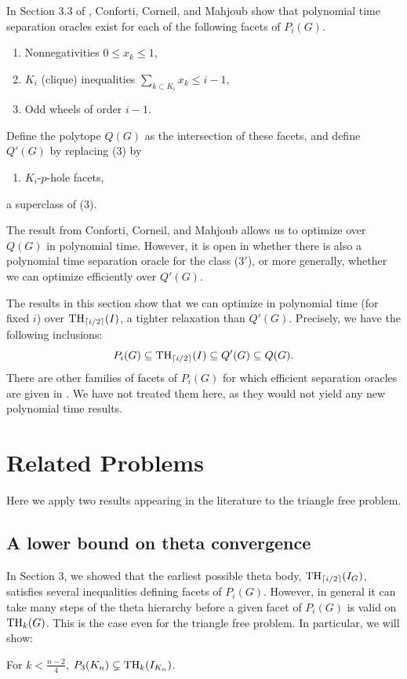 In Section 3.3 of \cite{conforti}, Conforti, Corneil, and Mahjoub show that polynomial time separation oracles exist for each of the following facets of $P_i(G)$.
\begin{enumerate}
\item Nonnegativities $0 \le x_k \le 1$,
\item $K_i$ (clique) inequalities $\sum_{k \subset K_i}x_k \le i-1$,
\item Odd wheels of order $i-1$.
\end{enumerate}
Define the polytope $Q(G)$ as the intersection of these facets, and define $Q'(G)$ by replacing (3) by 
\begin{enumerate}[label=(\arabic*$'$),ref=(\arabic*$'$),start=3]
\item $K_i$-$p$-hole facets,
\end{enumerate}
a superclass of (3).

The result from Conforti, Corneil, and Mahjoub \cite{conforti} allows us to optimize over $Q(G)$ in polynomial time. However, it is open in \cite{conforti} whether there is also a polynomial time separation oracle for the class ($3'$), or more generally, whether we can optimize efficiently over $Q'(G)$. 

The results in this section show that we can optimize in polynomial time (for
fixed $i$) over $\textup{TH}_{\lceil i/2 \rceil}(I)$, a tighter relaxation than $Q'(G)$. Precisely, we have the following inclusions:
$$P_{i}(G) \subseteq  \textup{TH}_{\lceil i/2 \rceil}(I) \subseteq Q'(G) \subseteq Q(G).$$
There are other families of facets of $P_i(G)$ for which efficient separation oracles are given in \cite{conforti}. We have not treated them here, as they would not yield any new polynomial time results.

\section{Related Problems}
Here we apply two results appearing in the literature to the triangle free problem.

\subsection{A lower bound on theta convergence}
In Section 3, we showed that the earliest possible theta body, $\textup{TH}_{\lceil i/2 \rceil}(I_G)$, satisfies several inequalities defining facets of $P_i(G)$. However, in general it can take many steps of the theta hierarchy before a given facet of $P_i(G)$ is valid on $\textup{TH}_k(G)$. This is the case even for the triangle free problem. In particular, we will show:
\begin{theorem}
For $k < \frac{n-2}{4}$, $P_3(K_n) \subsetneq \textup{TH}_{k}(I_{K_n})$.
\end{theorem}

